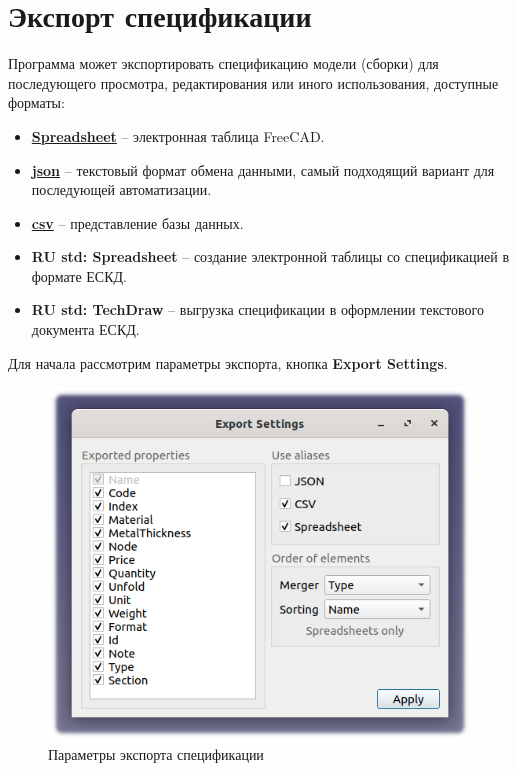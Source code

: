 \documentclass[a4paper,12pt]{article}
\begin{document}
\pagebreak


\section{Экспорт спецификации}

Программа может экспортировать спецификацию модели (сборки) для последующего просмотра, редактирования или иного использования, доступные форматы:

\begin{itemize}
	\item \href{https://wiki.freecad.org/Spreadsheet_Workbench}{\textbf{Spreadsheet}} -- электронная таблица FreeCAD.
	\item \href{https://ru.wikipedia.org/wiki/JSON}{\textbf{json}} --  текстовый формат обмена данными, самый подходящий вариант для последующей автоматизации.
	\item \href{https://ru.wikipedia.org/wiki/CSV}{\textbf{csv}} -- представление базы данных.
	\item \textbf{RU std: Spreadsheet} -- создание электронной таблицы со спецификацией в формате ЕСКД.
	\item \textbf{RU std: TechDraw} -- выгрузка спецификации в оформлении текстового документа ЕСКД.\\
\end{itemize}

\begin{flushleft}Для начала рассмотрим параметры экспорта, кнопка \textbf{Export Settings}.\end{flushleft}

\begin{figure}[htp]
	\centering
	\includegraphics[scale=1]{img/specification_export.png}
	\caption{Параметры экспорта спецификации}
	\label{sec:specification_export}
\end{figure}
\end{document}
